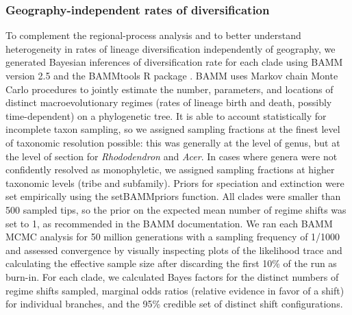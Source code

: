 \subsubsection*{Geography-independent rates of diversification}

To complement the regional-process analysis and to better understand
heterogeneity in rates of lineage diversification independently of
geography, we generated Bayesian inferences of diversification rate
for each clade using BAMM version 2.5 and the BAMMtools R package
\citep{Rabosky2014}. BAMM uses Markov chain Monte Carlo procedures to
jointly estimate the number, parameters, and locations of distinct
macroevolutionary regimes (rates of lineage birth and death, possibly
time-dependent) on a phylogenetic tree. It is able to account
statistically for incomplete taxon sampling, so we assigned sampling
fractions at the finest level of taxonomic resolution possible: this
was generally at the level of genus, but at the level of section for
\textit{Rhododendron} and \textit{Acer}. In cases where genera were
not confidently resolved as monophyletic, we assigned sampling
fractions at higher taxonomic levels (tribe and subfamily). Priors for
speciation and extinction were set empirically using the
\textrm{setBAMMpriors} function. All clades were smaller than 500
sampled tips, so the prior on the expected mean number of regime
shifts was set to 1, as recommended in the BAMM documentation. We ran
each BAMM MCMC analysis for 50 million generations with a sampling
frequency of 1/1000 and assessed convergence by visually inspecting
plots of the likelihood trace and calculating the effective sample
size after discarding the first 10\% of the run as burn-in. For each
clade, we calculated Bayes factors for the distinct numbers of regime
shifts sampled, marginal odds ratios (relative evidence in favor of a
shift) for individual branches, and the 95\% credible set of distinct
shift configurations.

